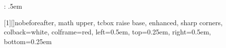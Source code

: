 
\newcommand\widecolourbox[1]{{\setlength\fboxrule{0.5pt}\setlength\fboxsep{3pt}\fcolorbox{red}{white}{\enspace#1\enspace }}}


{\topsep} %
{\topsep} %
{\itshape} %
{} %
{\sffamily} %
{:} %
{.5em} %
{} %
\theoremstyle{thmStyle} \newtheorem{example}{Example}
\theoremstyle{thmStyle} \newtheorem{remark}{Remark}
\theoremstyle{thmStyle} \newtheorem{definition}{Definition}
\theoremstyle{thmStyle} \newtheorem{lemma}{Lemma}
\theoremstyle{thmStyle} \newtheorem{corollary}{Corollary}
\theoremstyle{thmStyle} \newtheorem{theorem}{Theorem}

\setlength{\mathindent}{1em}


\renewcommand{\vec}{\vectorbold*} %

\newcommand{\dif}{\, \text{d}}
\newcommand{\diff}{\text{d}}

\def\doubleunderline#1{\underline{\underline{#1}}}

\newtcbox{\mathbox}[1][]{nobeforeafter, math upper, tcbox raise base, 
	enhanced, sharp corners, colback=white, colframe=red, left=0.5em, top=0.25em, right=0.5em, bottom=0.25em }

\makeatletter
\g@addto@macro \normalsize {%
	\setlength{}%
	\setlength{}%
}
\makeatother



